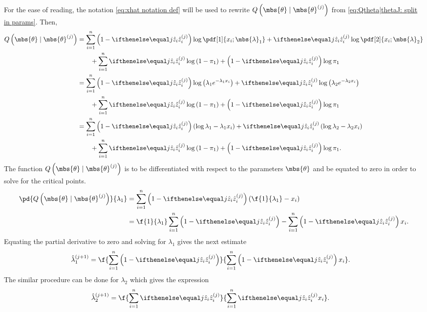 For the ease of reading, the notation \eqref{eq:xhat notation def} will be used to rewrite $Q\left( \mbs{\theta}\mid\mbs{\theta}^{(j)} \right)$ from \eqref{eq:Qtheta|thetaJ: split in params}. Then, 
\begin{align}
    Q\left( \mbs{\theta} \mid \mbs{\theta}^{(j)} \right)
    &=
    \sum_{i=1}^{n} \left(1-\zhat[j]{i}\right) \log \pdf[1]{{x}_{i}; \mbs{\lambda}_{1}} + \zhat[j]{i}\log\pdf[2]{{x}_{i}; \mbs{\lambda}_{2}}
    \nonumber\\&\qquad
    +\sum_{i=1}^{n}\zhat[j]{i}\log\left( 1-\pi_{1} \right) + \left(1-\zhat[j]{i}\right)\log\pi_{1}\\
    &=
    \sum_{i=1}^{n} \left(1-\zhat[j]{i}\right) \log \left( \lambda_{1}e^{-\lambda_{1} x_{i}} \right) + \zhat[j]{i}\log\left(\lambda_{2}e^{-\lambda_{2} x_{i}}\right)
    \nonumber\\&\qquad
    +\sum_{i=1}^{n}\zhat[j]{i}\log\left( 1-\pi_{1} \right)  + \left(1-\zhat[j]{i}\right)\log\pi_{1}\\
    &=
    \sum_{i=1}^{n} \left(1-\zhat[j]{i}\right)  \left( \log\lambda_{1} -\lambda_{1} x_{i} \right) + \zhat[j]{i}\left(\log\lambda_{2} -\lambda_{2} x_{i}\right)
    \nonumber\\&\qquad
    +\sum_{i=1}^{n}\zhat[j]{i}\log\left( 1-\pi_{1} \right) + \left(1-\zhat[j]{i}\right)\log\pi_{1}.
\end{align}
The function $Q\left( \mbs{\theta}\mid \mbs{\theta}^{(j)} \right)$ is to be differentiated with respect to the parameters $\mbs{\theta}$ and be equated to zero in order to solve for the critical points.
\begin{align}
    \pd{
        Q\left( \mbs{\theta}\mid \mbs{\theta}^{(j)} \right)
    }{
        \lambda_{1}
    }
    &= 
    \sum_{i=1}^{n} \left(1-\zhat[j]{i}\right)  \left( \f{1}{\lambda_{1}}- x_{i} \right)\\
    &= 
    \f{1}{\lambda_{1}}\sum_{i=1}^{n} \left(1-\zhat[j]{i}\right) 
    -
    \sum_{i=1}^{n} \left(1-\zhat[j]{i}\right) x_{i}.
\end{align}
Equating the partial derivative to zero and solving for $\lambda_{1}$ gives the next estimate
\begin{align}
    \hat{\lambda}_{1}^{(j+1)} 
    &= 
    \f{
        \sum_{i=1}^{n} \left(1-\zhat[j]{i}\right)
    }{
        \sum_{i=1}^{n} \left(1-\zhat[j]{i}\right) x_{i}  
    }.
\end{align}
The similar procedure can be done for $\lambda_{2}$ which gives the expression
\begin{align}
    \hat{\lambda}_{2}^{(j+1)} 
    &= 
    \f{
        \sum_{i=1}^{n} \zhat[j]{i}
    }{
        \sum_{i=1}^{n}\zhat[j]{i} x_{i}  
    }.
\end{align}
